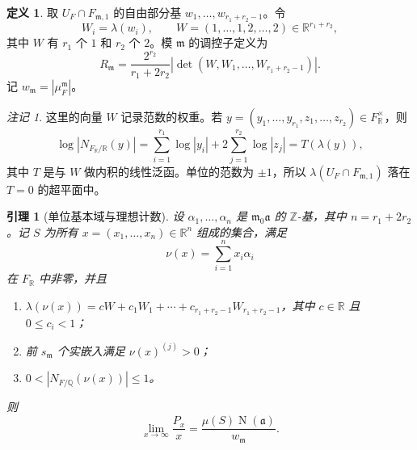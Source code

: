 \documentclass[11pt,a4paper,openany]{ctexbook}
\numberwithin{equation}{chapter}
\newcommand{\Q}{\mathbb{Q}}
\newcommand{\R}{\mathbb{R}}
\newcommand{\Z}{\mathbb{Z}}
\newcommand{\Nm}{\operatorname{N}}
\theoremstyle{plain}
\newtheorem{lemma}[theorem]{引理}
\theoremstyle{definition}
\newtheorem{definition}[theorem]{定义}
\theoremstyle{remark}
\newtheorem{remark}[theorem]{注记}
\begin{document}
\begin{definition}
取 $U_F\cap F_{\mathfrak m,1}$ 的自由部分基 $w_1,\dots,w_{r_1+r_2-1}$。令
\[
W_i=\lambda(w_i),\qquad
W=(1,\dots,1,2,\dots,2)\in\R^{r_1+r_2},
\]
其中 $W$ 有 $r_1$ 个 $1$ 和 $r_2$ 个 $2$。模 $\mathfrak m$ 的调控子定义为
\[
R_{\mathfrak m}
=\frac{2^{r_2}}{r_1+2r_2}
\left|\det(W,W_1,\dots,W_{r_1+r_2-1})\right|.
\]
记 $w_{\mathfrak m}=|\mu_F^{\mathfrak m}|$。
\end{definition}

\begin{remark}
这里的向量 $W$ 记录范数的权重。若
$y=(y_1,\dots,y_{r_1},z_1,\dots,z_{r_2})\in F_\R^\times$，则
\[
\log |N_{F_\R/\R}(y)|
=\sum_{i=1}^{r_1}\log |y_i|
 +2\sum_{j=1}^{r_2}\log |z_j|
 = T(\lambda(y)),
\]
其中 $T$ 是与 $W$ 做内积的线性泛函。单位的范数为 $\pm1$，所以
\(\lambda(U_F\cap F_{\mathfrak m,1})\) 落在 $T=0$ 的超平面中。
\end{remark}

\begin{lemma}[单位基本域与理想计数]
设 $\alpha_1,\dots,\alpha_n$ 是 $\mathfrak m_0\mathfrak a$ 的 $\Z$-基，其中
$n=r_1+2r_2$。记 $S$ 为所有 $x=(x_1,\dots,x_n)\in\R^n$ 组成的集合，满足
\[
\nu(x)=\sum_{i=1}^n x_i\alpha_i
\]
在 $F_\R$ 中非零，并且
\begin{enumerate}[label=(\arabic*)]
\item $\lambda(\nu(x))=cW+c_1W_1+\cdots+c_{r_1+r_2-1}W_{r_1+r_2-1}$，其中 $c\in\R$ 且 $0\le c_i<1$；
\item 前 $s_{\mathfrak m}$ 个实嵌入满足 $\nu(x)^{(j)}>0$；
\item $0<|N_{F/\Q}(\nu(x))|\le 1$。
\end{enumerate}
则
\[
\lim_{x\to\infty}\frac{P_x}{x}
=\frac{\mu(S)\Nm(\mathfrak a)}{w_{\mathfrak m}}.
\]
\end{lemma}
\end{document}

